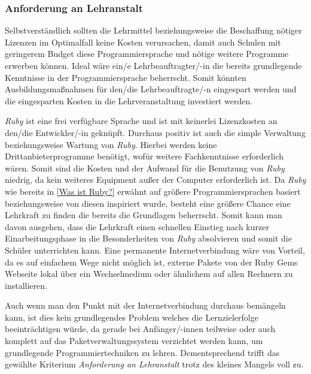 \documentclass[12pt,DIV=14, version=first, BCOR=10mm,a4paper,twoside,parskip=half-,headsepline,headinclude]{scrartcl}
\begin{document}
\subsubsection{Anforderung an Lehranstalt}
\begin{flushleft}
Selbstverständlich sollten die Lehrmittel beziehungsweise die Beschaffung nötiger Lizenzen im Optimalfall keine Kosten verursachen, damit auch Schulen mit geringerem Budget diese Programmiersprache und nötige weitere Programme erwerben können. Ideal wäre ein/e Lehrbeauftragter/-in die bereits grundlegende Kenntnisse in der Programmiersprache beherrscht. Somit könnten Ausbildungsmaßnahmen für den/die Lehrbeauftragte/-n eingespart werden und die eingesparten Kosten in die Lehrveranstaltung investiert werden.

\textit{\glqq Ruby\grqq} ist eine frei verfügbare Sprache und ist mit keinerlei Lizenzkosten an den/die Entwickler/-in geknüpft. Durchaus positiv ist auch die simple Verwaltung beziehungsweise Wartung von \textit{\glqq Ruby\grqq}. Hierbei werden keine Drittanbieterprogramme benötigt, wofür weitere Fachkenntnisse erforderlich wären. Somit sind die Kosten und der Aufwand für die Benutzung von \textit{\glqq Ruby\grqq} niedrig, da kein weiteres Equipment außer der Computer erforderlich ist. Da \textit{\glqq Ruby\grqq} wie bereits in \ref{Was ist Ruby?} erwähnt auf größere Programmiersprachen basiert beziehungsweise von diesen inspiriert wurde, besteht eine größere Chance eine Lehrkraft zu finden die bereits die Grundlagen beherrscht. Somit kann man davon ausgehen, dass die Lehrkraft einen schnellen Einstieg nach kurzer Einarbeitungsphase in die Besonderheiten von \textit{\glqq Ruby\grqq} absolvieren und somit die Schüler unterrichten kann. Eine permanente Internetverbindung wäre von Vorteil, da es auf einfachem Wege nicht möglich ist, externe Pakete von der Ruby Gems Webseite lokal über ein Wechselmedium oder ähnlichem auf allen Rechnern zu installieren.

Auch wenn man den Punkt mit der Internetverbindung durchaus bemängeln kann, ist dies kein grundlegendes Problem welches die Lernzielerfolge beeinträchtigen würde, da gerade bei Anfänger/-innen teilweise oder auch komplett auf das Paketverwaltungssystem verzichtet werden kann, um grundlegende Programmiertechniken zu lehren. Dementsprechend trifft das gewählte Kriterium \textit{Anforderung an Lehranstalt} trotz des kleines Mangels voll zu.
\end{flushleft}
\end{document}
